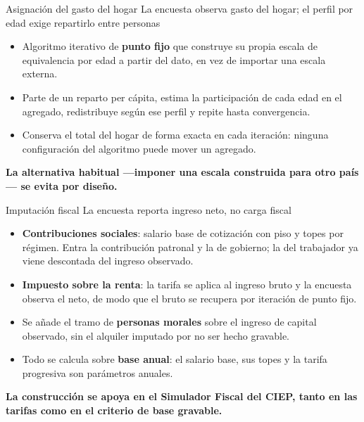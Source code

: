 \documentclass[aspectratio=169,11pt]{beamer}
\newcommand{\bajada}[1]{{\small\textcolor{gris}{#1}}\vspace{0.5em}}
\newcommand{\cierre}[1]{%
  \vfill{\small\textcolor{acento}{\textbf{#1}}}}
\begin{document}
\begin{frame}{Asignación del gasto del hogar}
\bajada{La encuesta observa gasto del hogar; el perfil por edad exige repartirlo entre personas}

\begin{itemize}\itemsep0.5em
  \item Algoritmo iterativo de \textbf{punto fijo} que construye su propia escala de equivalencia
        por edad a partir del dato, en vez de importar una escala externa.
  \item Parte de un reparto per cápita, estima la participación de cada edad en el agregado,
        redistribuye según ese perfil y repite hasta convergencia.
  \item Conserva el total del hogar de forma exacta en cada iteración: ninguna configuración del
        algoritmo puede mover un agregado.
\end{itemize}

\cierre{La alternativa habitual ---imponer una escala construida para otro país--- se evita por
diseño.}
\end{frame}

\begin{frame}{Imputación fiscal}
\bajada{La encuesta reporta ingreso neto, no carga fiscal}

\begin{itemize}\itemsep0.5em
  \item \textbf{Contribuciones sociales}: salario base de cotización con piso y topes por régimen.
        Entra la contribución patronal y la de gobierno; la del trabajador ya viene descontada del
        ingreso observado.
  \item \textbf{Impuesto sobre la renta}: la tarifa se aplica al ingreso bruto y la encuesta
        observa el neto, de modo que el bruto se recupera por iteración de punto fijo.
  \item Se añade el tramo de \textbf{personas morales} sobre el ingreso de capital observado, sin
        el alquiler imputado por no ser hecho gravable.
  \item Todo se calcula sobre \textbf{base anual}: el salario base, sus topes y la tarifa
        progresiva son parámetros anuales.
\end{itemize}

\cierre{La construcción se apoya en el Simulador Fiscal del CIEP, tanto en las tarifas como en el
criterio de base gravable.}
\end{frame}
\end{document}
